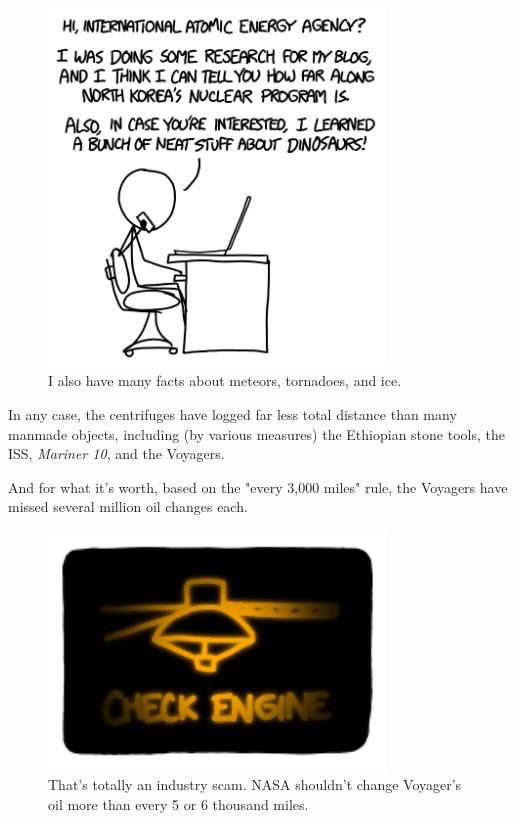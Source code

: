 {\begin{figure}[!htbp]
\centering
\includegraphics[scale=0.5, max width=0.8\textwidth]{imgs/a/86/far_iaea.png}
\caption{I also have many facts about meteors, tornadoes, and ice.}
\end{figure}

{In any case, the centrifuges have logged far less total distance than many manmade objects, including (by various measures) the Ethiopian stone tools, the ISS, \emph{Mariner 10}, and the Voyagers.}

{And for what it's worth, based on the "every 3,000 miles" rule, the Voyagers have missed several million oil changes each.}

\begin{figure}[!htbp]
\centering
\includegraphics[scale=0.5, max width=0.8\textwidth]{imgs/a/86/far_light.png}
\caption{That's totally an industry scam. NASA shouldn't change Voyager's oil more than every 5 or 6 thousand miles.}
\end{figure}

}
